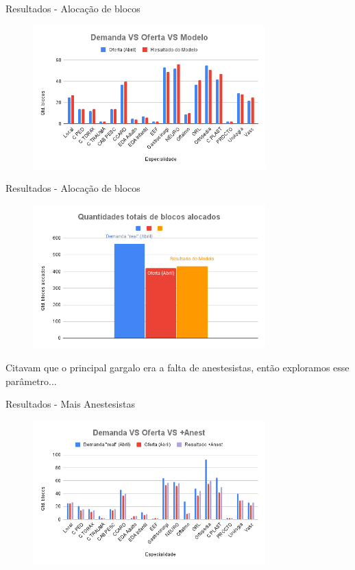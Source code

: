 \documentclass[10pt]{beamer}
\begin{document}
\begin{frame}{Resultados - Alocação de blocos}
    \begin{figure}
        \includegraphics[width=0.8\textwidth]{images/esps_modelo.png}
    \end{figure}
\end{frame}


\begin{frame}{Resultados - Alocação de blocos}
    \begin{figure}
        \centering
        \includegraphics[width=0.8\textwidth]{images/totais_modelo.png}
    \end{figure}
    Citavam que o principal gargalo era a falta de anestesistas, então exploramos esse parâmetro...
\end{frame}


\begin{frame}{Resultados - Mais Anestesistas}
    \begin{figure}
        \includegraphics[width=0.8\textwidth]{images/esps_anest.png}
    \end{figure}
\end{frame}
\end{document}
